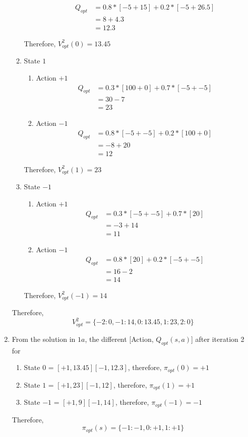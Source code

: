 \documentclass[12pt]{article}
\begin{document}
\begin{enumerate}[label=(\alph*)]
\begin{enumerate}
\begin{enumerate}
\begin{align*}
	 Q_{opt} &= 0.8 * [-5 + 15] + 0.2 * [-5 + 26.5] \\
	 &= 8 + 4.3 \\
	 &= 12.3
	 \end{align*}
 \end{enumerate}
 Therefore, $V_{opt}^2(0) = 13.45$
 \item State $1$
	\begin{enumerate}
		\item Action $+1$ \\
			\begin{align*}
				Q_{opt} &= 0.3 * [100 + 0] + 0.7 * [-5 + -5] \\
				&= 30 - 7 \\
				&= 23
			\end{align*}
		\item Action $-1$ \\
			\begin{align*}
				Q_{opt} &= 0.8 * [-5 + -5] + 0.2 * [100 + 0] \\
				&= -8 + 20 \\
				&= 12
			\end{align*}
	\end{enumerate}
	Therefore, $V_{opt}^2(1) = 23$
\item State $-1$
	\begin{enumerate}
		\item Action $+1$
			\begin{align*}
				Q_{opt} &= 0.3 * [-5 + -5] + 0.7 * [20] \\
				&= -3 + 14 \\
				&= 11
			\end{align*}
		\item Action $-1$
			\begin{align*}
				Q_{opt} &= 0.8 * [20] + 0.2 * [-5 + -5] \\
				&= 16 - 2 \\
				&= 14
			\end{align*}
	\end{enumerate}
	Therefore, $V_{opt}^2(-1) = 14$
 \end{enumerate}
 Therefore, $$V_{opt}^2 = \{ -2: 0, -1: 14, 0: 13.45, 1: 23, 2: 0\}$$
  \item From the solution in $1a$, the different [Action, $Q_{opt}(s,a)$] after iteration 2 for
  	\begin{enumerate}
  		\item State $0$ = $[+1, 13.45] [-1, 12.3]$, therefore, $\pi_{opt}(0) = +1$
  		\item State $1$ = $[+1, 23] [-1, 12]$, therefore, $\pi_{opt}(1) = +1$
  		\item State $-1$ = $[+1, 9] [-1, 14]$, therefore, $\pi_{opt}(-1) = -1$
  	\end{enumerate}
  	Therefore, $$\pi_{opt}(s) = \{ -1: -1, 0: +1, 1: +1 \}$$
\end{enumerate}
\end{document}

